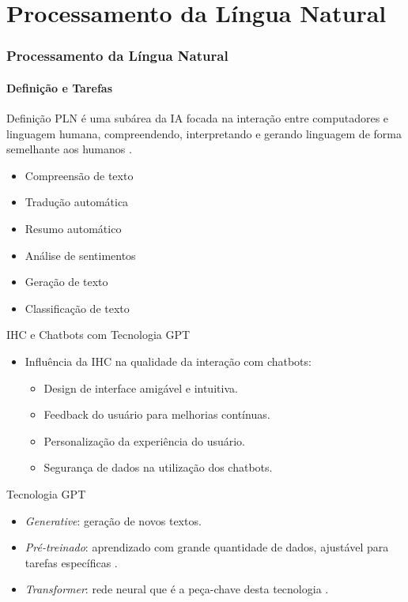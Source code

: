 \documentclass{beamer}
\begin{document}
\section{Processamento da Língua Natural}
\begin{frame}
    \frametitle{Processamento da Língua Natural}
    \framesubtitle{Definição e Tarefas}
    \begin{block}{Definição}
        PLN é uma subárea da IA focada na interação entre computadores e linguagem humana, compreendendo, interpretando e gerando linguagem de forma semelhante aos humanos \cite{hapke2019natural}.
    \end{block}
    \begin{itemize}
        \item Compreensão de texto
        \item Tradução automática
        \item Resumo automático
        \item Análise de sentimentos
        \item Geração de texto
        \item Classificação de texto
    \end{itemize}
\end{frame}


\begin{frame}{IHC e Chatbots com Tecnologia GPT}
    \begin{itemize}
        \item Influência da IHC na qualidade da interação com chatbots:
        \begin{itemize}
            \item Design de interface amigável e intuitiva.
            \item Feedback do usuário para melhorias contínuas.
            \item Personalização da experiência do usuário.
            \item Segurança de dados na utilização dos chatbots.
        \end{itemize}
    \end{itemize}
\end{frame}

\begin{frame}{Tecnologia GPT}
    \begin{itemize}
        \item \textit{Generative}: geração de novos textos.
        \item \textit{Pré-treinado}: aprendizado com grande quantidade de dados, ajustável para tarefas específicas \cite{devlin2018bert}.
        \item \textit{Transformer}: rede neural que é a peça-chave desta tecnologia \cite{Attention-Is-All-You-Need}.
    \end{itemize}
\end{frame}
\end{document}
